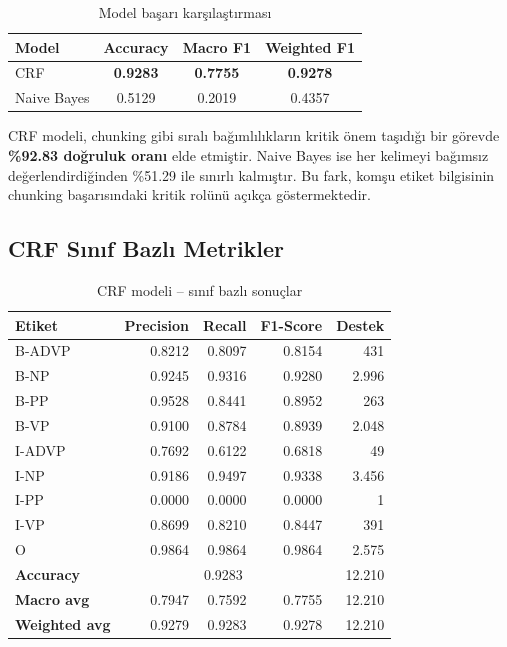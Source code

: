 \documentclass[12pt,a4paper]{article}
\begin{document}
\begin{table}[H]
\centering
\caption{Model başarı karşılaştırması}
\begin{tabular}{lccc}
\toprule
\textbf{Model} & \textbf{Accuracy} & \textbf{Macro F1} & \textbf{Weighted F1} \\
\midrule
CRF         & \textbf{0.9283} & \textbf{0.7755} & \textbf{0.9278} \\
Naive Bayes & 0.5129          & 0.2019          & 0.4357          \\
\bottomrule
\end{tabular}
\end{table}

CRF modeli, chunking gibi sıralı bağımlılıkların kritik önem taşıdığı bir görevde
\textbf{\%92.83 doğruluk oranı} elde etmiştir. Naive Bayes ise her kelimeyi
bağımsız değerlendirdiğinden \%51.29 ile sınırlı kalmıştır. Bu fark,
komşu etiket bilgisinin chunking başarısındaki kritik rolünü açıkça göstermektedir.

\subsection{CRF Sınıf Bazlı Metrikler}

\begin{table}[H]
\centering
\caption{CRF modeli -- sınıf bazlı sonuçlar}
\begin{tabular}{lrrrr}
\toprule
\textbf{Etiket} & \textbf{Precision} & \textbf{Recall} & \textbf{F1-Score} & \textbf{Destek} \\
\midrule
B-ADVP & 0.8212 & 0.8097 & 0.8154 &   431 \\
B-NP   & 0.9245 & 0.9316 & 0.9280 & 2.996 \\
B-PP   & 0.9528 & 0.8441 & 0.8952 &   263 \\
B-VP   & 0.9100 & 0.8784 & 0.8939 & 2.048 \\
I-ADVP & 0.7692 & 0.6122 & 0.6818 &    49 \\
I-NP   & 0.9186 & 0.9497 & 0.9338 & 3.456 \\
I-PP   & 0.0000 & 0.0000 & 0.0000 &     1 \\
I-VP   & 0.8699 & 0.8210 & 0.8447 &   391 \\
O      & 0.9864 & 0.9864 & 0.9864 & 2.575 \\
\midrule
\textbf{Accuracy}     & \multicolumn{3}{c}{0.9283} & 12.210 \\
\textbf{Macro avg}    & 0.7947 & 0.7592 & 0.7755 & 12.210 \\
\textbf{Weighted avg} & 0.9279 & 0.9283 & 0.9278 & 12.210 \\
\bottomrule
\end{tabular}
\end{table}
\end{document}
